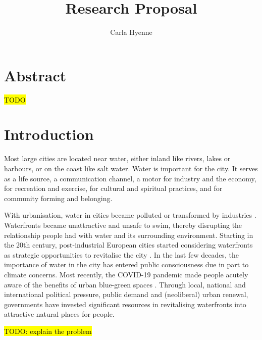 \documentclass{article}
\title{Research Proposal}
\author{Carla Hyenne}
\date{}
\begin{document}
\maketitle

\tableofcontents 


\section{Abstract}

\hl{TODO}


\section{Introduction}

Most large cities are located near water, either inland like rivers, lakes or harbours, or on the coast like salt water. Water is important for the city. It serves as a life source, a communication channel, a motor for industry and the economy, for recreation and exercise, for cultural and spiritual practices, and for community forming and belonging. 

With urbanisation, water in cities became polluted or transformed by industries \parencite{kampa_langaas_anzaldua_2016}. 
Waterfronts became unattractive and unsafe to swim, thereby disrupting the relationship people had with water and its surrounding environment.
Starting in the 20th century, post-industrial European cities started considering waterfronts as strategic opportunities to revitalise the city \parencite{del2021dismantling}. In the last few decades, the importance of water in the city has entered public consciousness due in part to climate concerns. Most recently, the COVID-19 pandemic made people acutely aware of the benefits of urban blue-green spaces \parencite{kohsaka2021urban}.
Through local, national and international political pressure, public demand and (neoliberal) urban renewal, governments have invested significant resources in revitalising waterfronts into attractive natural places for people. 

\hl{TODO: explain the problem}
\end{document}
